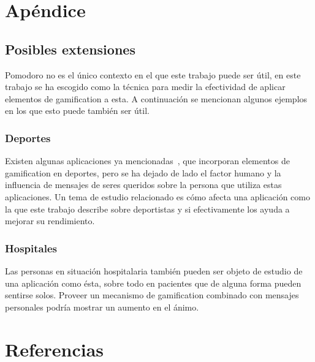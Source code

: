 \documentclass[12pt,letterpaper]{report}
\begin{document}
\newpage
\section{Apéndice}\label{sec:apendice}

\subsection{Posibles extensiones}\label{subsec:posibles-extensiones}

Pomodoro no es el único contexto en el que este trabajo puede ser útil, en este trabajo se ha escogido como la técnica
para medir la efectividad de aplicar elementos de gamification a esta. A continuación se mencionan algunos ejemplos en
los que esto puede también ser útil.

\subsubsection{Deportes}

Existen algunas aplicaciones ya mencionadas~\cite{zombiesrun}, que incorporan elementos de gamification en deportes,
pero se ha dejado de lado el factor humano y la influencia de mensajes de seres queridos sobre la persona que utiliza
estas aplicaciones. Un tema de estudio relacionado es cómo afecta una aplicación como la que este trabajo describe sobre
deportistas y si efectivamente los ayuda a mejorar su rendimiento.

\subsubsection{Hospitales}

Las personas en situación hospitalaria también pueden ser objeto de estudio de una aplicación como ésta, sobre todo en
pacientes que de alguna forma pueden sentirse solos. Proveer un mecanismo de gamification combinado con mensajes
personales podría mostrar un aumento en el ánimo.

\newpage
\section{Referencias}
\printbibliography[heading=none]
\end{document}
